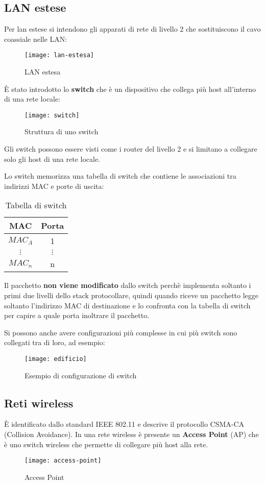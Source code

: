 \documentclass[a4paper]{article}
\begin{document}
\subsection{LAN estese}
Per lan estese si intendono gli apparati di rete di livello 2 che sostituiscono il cavo
coassiale nelle LAN:
\begin{figure}[H]
  \centering
  \texttt{[image: lan-estesa]}
  \caption{LAN estesa}
\end{figure}
\noindent
È stato introdotto lo \textbf{switch} che è un dispositivo che collega più host
all'interno di una rete locale:
\begin{figure}[H]
  \centering
  \texttt{[image: switch]}
  \caption{Struttura di uno switch}
\end{figure}
\noindent
Gli switch possono essere visti come i router del livello 2 e si limitano a
collegare solo gli host di una rete locale.

Lo switch memorizza una tabella di switch che contiene le associazioni tra indirizzi
MAC e porte di uscita:
\begin{table}[H]
  \centering
  \begin{tabular}{|c|c|}
    \hline
    MAC & Porta \\
    \hline
    \( MAC_A \) & 1 \\
    \( \vdots \) & \( \vdots \) \\
    \( MAC_n \) & n \\
    \hline
  \end{tabular}
  \caption{Tabella di switch}
\end{table}
\noindent
Il pacchetto \textbf{non viene modificato} dallo switch perchè implementa soltanto
i primi due livelli dello stack protocollare, quindi quando riceve un pacchetto
legge soltanto l'indirizzo MAC di destinazione e lo confronta con la tabella di switch
per capire a quale porta inoltrare il pacchetto.

\vspace{1em}
\noindent
Si possono anche avere configurazioni più complesse in cui più switch sono collegati
tra di loro, ad esempio:
\begin{figure}[H]
  \centering
  \texttt{[image: edificio]}
  \caption{Esempio di configurazione di switch}
\end{figure}

\subsection{Reti wireless}
È identificato dallo standard IEEE 802.11 e descrive il protocollo CSMA-CA (Collision
Avoidance). In una rete wireless è presente un \textbf{Access Point} (AP) che è
uno switch wireless che permette di collegare più host alla rete.
\begin{figure}[H]
  \centering
  \texttt{[image: access-point]}
  \caption{Access Point}
\end{figure}
\end{document}
